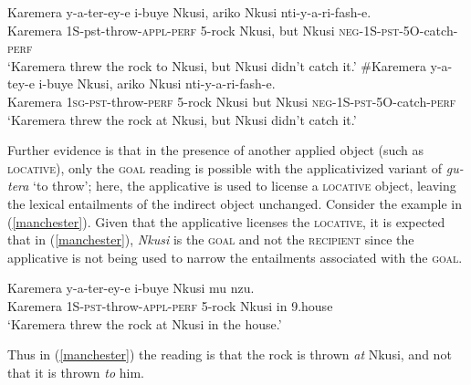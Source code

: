 \documentclass[output=paper]{langsci/langscibook}
\begin{document}
\begin{exe}
	\ex\label{danny}\begin{xlist}
	\iffalse
		\ex\gll Karemera y-a-tey-e i-buye Nkusi, ariko Karemera a-ra-mu-hush-a.\\
				Karemera {\scshape 1S-pst}-throw-{\scshape perf} 5-rock Nkusi, but Karemera {\scshape 1S-pst-1O}-miss-{\scshape imp}\\
				\glt `Karemera threw the rock at Nkusi, but Karemera missed.'
	\fi
		\ex\gll  Karemera y-a-ter-ey-e i-buye Nkusi, ariko Nkusi nti-y-a-ri-fash-e.\\
				Karemera 1S{\sc-pst-}throw-{\scshape appl-perf} 5-rock Nkusi, but Nkusi {\scshape neg-1S-pst-5O}-catch-{\scshape perf}\\
		\glt `Karemera threw the rock to Nkusi, but Nkusi didn't catch it.'
	\ex\gll \#Karemera y-a-tey-e i-buye Nkusi, ariko Nkusi nti-y-a-ri-fash-e.\\
			Karemera {\scshape 1sg-pst-}throw-{\scshape perf} 5-rock Nkusi but Nkusi {\scshape neg-1S-pst-5O}-catch-{\scshape perf}\\	
		\glt `Karemera threw the rock at Nkusi, but Nkusi didn't catch it.'
\end{xlist}
\end{exe}

Further evidence is that in the presence of another applied object (such as {\scshape locative}), only the {\scshape goal} reading is possible with the applicativized variant of \emph{gu-tera} `to throw'; here, the applicative is used to license a {\scshape locative} object, leaving the lexical entailments of the indirect object unchanged. Consider the example in (\ref{manchester}). Given that the applicative licenses the {\scshape locative}, it is expected that in (\ref{manchester}), \emph{Nkusi} is the {\scshape goal} and not the {\scshape recipient} since the applicative is not being used to narrow the entailments associated with the {\scshape goal}. 

\begin{exe}
\ex\label{manchester}\gll Karemera y-a-ter-ey-e i-buye Nkusi mu nzu.\\
		Karemera {\scshape 1S-pst-}throw-{\scshape appl-perf} 5-rock Nkusi in 9.house\\
		\glt `Karemera threw the rock at Nkusi in the house.'\\
	\end{exe}
	Thus in (\ref{manchester}) the reading is that the rock is thrown \emph{at} Nkusi, and not that it is thrown \emph{to} him.
		
\end{document}
